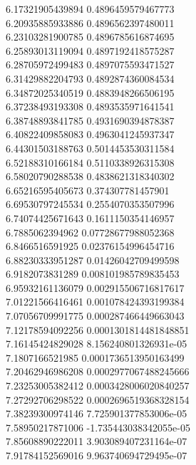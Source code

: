 {6.17321905439894 0.4896459579467773
 \\
6.20935885933886 0.4896562397480011
 \\
6.23103281900785 0.4896785616874695
 \\
6.25893013119094 0.4897192418575287
 \\
6.28705972499483 0.4897075593471527
 \\
6.31429882204793 0.4892874360084534
 \\
6.34872025340519 0.4883948266506195
 \\
6.37238493193308 0.4893535971641541
 \\
6.38748893841785 0.4931690394878387
 \\
6.40822409858083 0.4963041245937347
 \\
6.44301503188763 0.5014453530311584
 \\
6.52188310166184 0.5110338926315308
 \\
6.58020790288538 0.4838621318340302
 \\
6.65216595405673 0.374307781457901
 \\
6.69530797245534 0.2554070353507996
 \\
6.74074425671643 0.1611150354146957
 \\
6.7885062394962 0.07728677988052368
 \\
6.8466516591925 0.02376154996454716
 \\
6.88230333951287 0.01426042709499598
 \\
6.9182073831289 0.008101985789835453
 \\
6.95932161136079 0.002915506716817617
 \\
7.01221566416461 0.001078424393199384
 \\
7.07056709991775 0.000287466449663043
 \\
7.12178594092256 0.0001301814481848851
 \\
7.16145424829028 8.156240801326931e-05
 \\
7.1807166521985 0.0001736513950163499
 \\
7.20462946986208 0.0002977067488245666
 \\
7.23253005382412 0.0003428006020840257
 \\
7.27292706298522 0.0002696519368328154
 \\
7.38239300974146 7.725901377853006e-05
 \\
7.58950217871006 -1.735443038342055e-05
 \\
7.85608890222011 3.903089407231164e-07
 \\
7.91784152569016 9.963740694729495e-07
}
